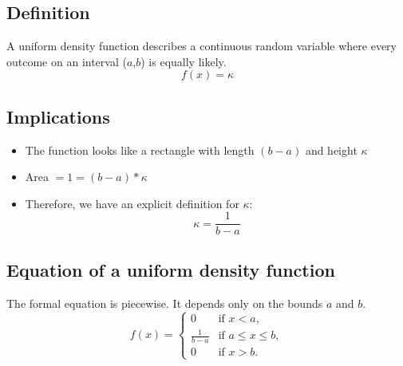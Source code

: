 \documentclass[12pt,letterpaper]{article}
\begin{document}
\subsection{Definition}
A uniform density function describes a continuous random variable where every outcome on an interval ($a$,$b$) is equally likely.
\begin{equation*}
f(x) = \kappa
\end{equation*}
\subsection{Implications}
\begin{itemize}
\item The function looks like a rectangle with length $(b-a)$ and height $\kappa$
\item Area $= 1 = (b-a)*\kappa$
\item Therefore, we have an explicit definition for $\kappa$:
\begin{equation*}
\kappa = \frac{1}{b-a}
\end{equation*}
\end{itemize}
\subsection{Equation of a uniform density function}
The formal equation is piecewise. It depends only on the bounds $a$ and $b$.
\begin{equation*}
f(x)=
\begin{cases}
0 & \text{if } x < a,\\
\frac{1}{b-a} & \text{if } a \leq x \leq b,\\
0 & \text{if } x > b.
\end{cases}
\end{equation*}
\end{document}
